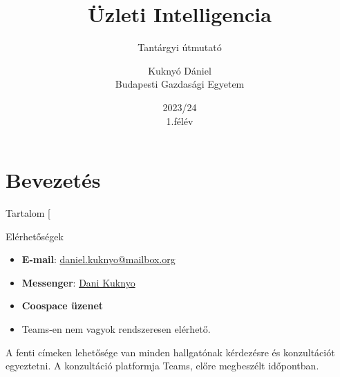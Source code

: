 \documentclass[english, aspectratio=169]{beamer}
\makeatletter
\newcommand\makebeamertitle{\frame{\maketitle}}
\let\origtableofcontents=\tableofcontents
\def\tableofcontents{\@ifnextchar[{\origtableofcontents}{\gobbletableofcontents}}
\def\gobbletableofcontents#1{\origtableofcontents}
\makeatother
\begin{document}
\section{Bevezetés}
\title[]{Üzleti Intelligencia}
\subtitle{Tantárgyi útmutató}
\author[Kuknyó Dániel]{Kuknyó Dániel\\Budapesti Gazdasági Egyetem}
\date{2023/24\\1.félév}
\makebeamertitle

\begin{frame}{Tartalom}
\tableofcontents{}
\end{frame}

\begin{frame}{Elérhetőségek}
\begin{center}
\begin{itemize}
	\item \textbf{E-mail}: \href{mailto:daniel.kuknyo@mailbox.org}{daniel.kuknyo@mailbox.org}
	\item \textbf{Messenger}: \href{https://www.facebook.com/dani.kkny/}{Dani Kuknyo}
	\item \textbf{Coospace üzenet}
	\item Teams-en nem vagyok rendszeresen elérhető. 
\end{itemize}
\end{center}
A fenti címeken lehetősége van minden hallgatónak kérdezésre és konzultációt egyeztetni. A konzultáció platformja Teams, előre megbeszélt időpontban.
\end{frame}
\end{document}
